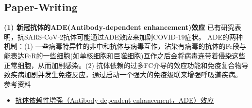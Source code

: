 \subsection{Paper-Writing}
\noindent\textbf{(1) 新冠抗体的ADE(Antibody-dependent enhancement)效应}
\newline\indent 已有研究表明，抗SARS-CoV-2抗体可能通过ADE效应来加剧COVID-19症状。
ADE的两种机制：(1) 一些病毒特异性的非中和抗体与病毒互作，沾染有病毒的抗体的Fc段与能表达FcR的一些细胞(如单核细胞和巨噬细胞)互作之后会将病毒连带着侵染这些正常细胞，从而加剧感染。(2) 抗体依赖的过多FC介导的效应功能和免疫复合物导致疾病加剧并发生免疫反应，通过启动一个强大的免疫级联来增强呼吸道疾病。
\newline\noindent 参考资料
\begin{itemize}
    \item \href{https://zhuanlan.zhihu.com/p/677496719#:~:text=%E7%96%AB%E8%8B%97%E5%92%8C%E6%8A%97%E4%BD%93%E8%8D%AF%E7%89%A9%E7%9A%84%E4%B8%80%E4%B8%AA%E4%B8%BB%E8%A6%81%E7%9B%AE%E6%A0%87%E6%98%AF%E4%BA%A7%E7%94%9F%E6%8A%97%E4%BD%93%EF%BC%8C%E9%80%9A%E8%BF%87%E9%98%BB%E6%96%AD%E7%97%85%E6%AF%92%E4%B8%8E%E5%85%B6%E7%BB%86%E8%83%9E%E5%8F%97%E4%BD%93%E7%BB%93%E5%90%88%E6%88%96%E4%B8%8E%E7%BB%86%E8%83%9E%E8%86%9C%E7%9A%84%E8%9E%8D%E5%90%88%E4%BD%9C%E7%94%A8%E9%98%BB%E6%AD%A2%E6%96%B0%E5%86%A0%E7%97%85%E6%AF%92%EF%BC%88SARS-CoV-2%EF%BC%89%E8%BF%9B%E5%85%A5%E7%BB%86%E8%83%9E%E3%80%82%20%E7%84%B6%E8%80%8C%EF%BC%8C%E5%9F%BA%E4%BA%8E%E6%8A%97%E4%BD%93%E7%9A%84%E7%96%AB%E8%8B%97%E5%8F%8A%E8%8D%AF%E7%89%A9%E7%96%97%E6%B3%95%E7%9A%84%E4%B8%80%E4%B8%AA%E6%BD%9C%E5%9C%A8%E9%9A%9C%E7%A2%8D%E6%98%AF%EF%BC%9A%E6%8A%97%E4%BD%93%E4%BE%9D%E8%B5%96%E6%80%A7%E5%A2%9E%E5%BC%BA%EF%BC%88Antibody%20dependent%20enhancement%EF%BC%8CADE%EF%BC%89%E6%95%88%E5%BA%94%E3%80%82,%E5%B7%B2%E6%9C%89%E7%A0%94%E7%A9%B6%E8%A1%A8%E6%98%8E%EF%BC%8C%E6%8A%97SARS-CoV-2%E6%8A%97%E4%BD%93%E5%8F%AF%E8%83%BD%E9%80%9A%E8%BF%87ADE%E6%95%88%E5%BA%94%E6%9D%A5%E5%8A%A0%E5%89%A7COVID-19%E7%97%87%E7%8A%B6%E3%80%82%20ADE%E5%8F%91%E7%94%9F%E6%9C%BA%E5%88%B6%20%E6%89%80%E8%B0%93%E7%9A%84ADE%E6%95%88%E5%BA%94%E6%98%AF%E6%8C%87%E6%9F%90%E4%BA%9B%E7%97%85%E6%AF%92%E7%89%B9%E5%BC%82%E6%80%A7%E6%8A%97%E4%BD%93%20%28%E4%B8%80%E8%88%AC%E5%A4%9A%E4%B8%BA%E9%9D%9E%E4%B8%AD%E5%92%8C%E6%8A%97%E4%BD%93%29%E4%B8%8E%E7%97%85%E6%AF%92%E7%BB%93%E5%90%88%E5%90%8E%EF%BC%8C%E7%BB%93%E5%90%88%E4%BA%86%E7%97%85%E6%AF%92%E7%9A%84%E6%8A%97%E4%BD%93%E5%8F%AF%E9%80%9A%E8%BF%87%E5%85%B6%E6%8A%97%E4%BD%93Fc%E6%AE%B5%E4%B8%8E%E6%9F%90%E4%BA%9B%E8%A1%A8%E9%9D%A2%E8%A1%A8%E8%BE%BEFcR%E7%9A%84%E7%BB%86%E8%83%9E%E7%BB%93%E5%90%88%E4%BB%8E%E8%80%8C%E4%BB%8B%E5%AF%BC%E7%97%85%E6%AF%92%E8%BF%9B%E5%85%A5%E8%BF%99%E4%BA%9B%E7%BB%86%E8%83%9E%E3%80%82%20%E4%B8%80%E8%88%AC%E8%AE%A4%E4%B8%BA%EF%BC%8C%E5%9C%A8%E4%BD%BF%E7%94%A8%E7%96%AB%E8%8B%97%E6%88%96%E6%8A%97%E4%BD%93%E6%B2%BB%E7%96%97%E7%97%85%E6%AF%92%E6%84%9F%E6%9F%93%E6%97%B6%EF%BC%8C%E5%A6%82%E6%9E%9C%E4%BA%A7%E7%94%9F%E7%9A%84%E6%8A%97%E4%BD%93%E6%95%88%E4%BB%B7%E4%B8%8D%E9%AB%98%E6%88%96%E8%80%85%E9%9D%9E%E4%B8%AD%E5%92%8C%E6%8A%97%E4%BD%93%E6%97%B6%EF%BC%8C%E5%B0%B1%E4%BC%9A%E4%BA%A7%E7%94%9FADE%E6%95%88%E5%BA%94%E3%80%82}{抗体依赖性增强（Antibody dependent enhancement，ADE）效应}
\end{itemize}
